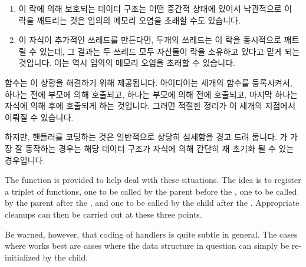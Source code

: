 \begin{enumerate}
\item	이 락에 의해 보호되는 데이터 구조는 어떤 중간적 상태에 있어서
	낙관적으로 이 락을 깨트리는 것은 임의의 메모리 오염을 초래할 수도
	있습니다.
\item	이 자식이 추가적인 쓰레드를 만든다면, 두개의 쓰레드는 이 락을
	동시적으로 깨트릴 수 있는데, 그 결과는 두 쓰레드 모두 자신들이 락을
	소유하고 있다고 믿게 되는 것입니다.
	이는 역시 임의의 메모리 오염을 초래할 수 있습니다.

\end{enumerate}

 함수는 이 상황을 해결하기 위해 제공됩니다.
아이디어는 세개의 함수를 등록시켜서, 하나는  전에 부모에 의해
호출되고, 하나는 부모에 의해  전에 호출되고, 마지막 하나는 자식에
의해  후에 호출되게 하는 것입니다.
그러면 적절한 정리가 이 세개의 지점에서 이뤄질 수 있습니다.

하지만,  핸들러를 코딩하는 것은 일반적으로 상당히 섬세함을
경고 드려 둡니다.
 가 가장 잘 동작하는 경우는 해당 데이터 구조가 자식에 의해
간단히 재 초기화 될 수 있는 경우입니다.

\iffalse

The  function is provided to help deal with these situations.
The idea is to register a triplet of functions, one to be called by the
parent before the , one to be called by the parent after the
, and one to be called by the child after the .
Appropriate cleanups can then be carried out at these three points.

Be warned, however, that coding of  handlers is quite subtle
in general.
The cases where  works best are cases where the data structure
in question can simply be re-initialized by the child.

